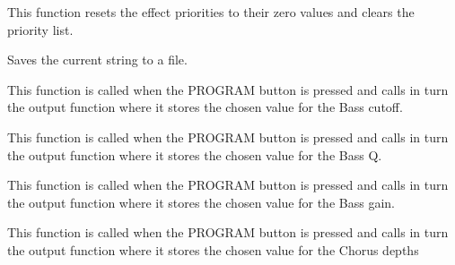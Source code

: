 \documentclass[letterpaper,10pt,english]{sphinxmanual}
\begin{document}
\begin{fulllineitems}
\label{Code:GUI.resetbtn}
This function resets the effect priorities to their zero values and clears the priority list.

\end{fulllineitems}


\begin{fulllineitems}
\label{Code:GUI.saveFile}
Saves the current string to a file.

\end{fulllineitems}


\begin{fulllineitems}
\label{Code:GUI.set_bc}
This function is called when the PROGRAM button is pressed and calls in turn the output function where it stores the chosen 
value for the Bass cutoff.

\end{fulllineitems}


\begin{fulllineitems}
\label{Code:GUI.set_bq}
This function is called when the PROGRAM button is pressed and calls in turn the output function where it stores the chosen 
value for the Bass Q.

\end{fulllineitems}


\begin{fulllineitems}
\label{Code:GUI.set_bv}
This function is called when the PROGRAM button is pressed and calls in turn the output function where it stores the chosen 
value for the Bass gain.

\end{fulllineitems}


\begin{fulllineitems}
\label{Code:GUI.set_chorusDepth}
This function is called when the PROGRAM button is pressed and calls in turn the output function where it stores the chosen 
value for the Chorus depths

\end{fulllineitems}
\end{document}
